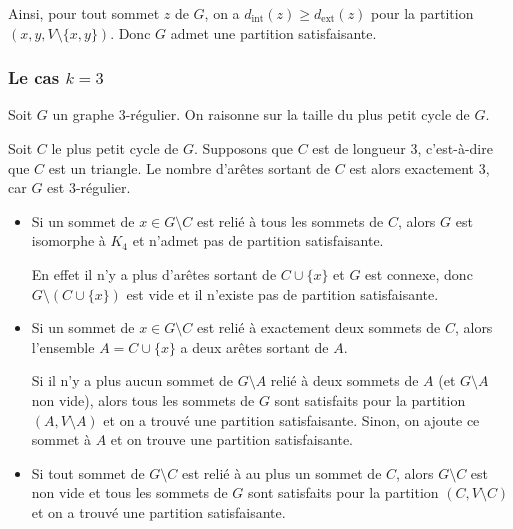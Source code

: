 Ainsi, pour tout sommet \(z\) de \(G\), on a \(d_{\mathrm{int}}(z) \geq d_{\mathrm{ext}}(z)\) pour la partition \(({x, y}, V \setminus \{x, y\})\).
Donc \(G\) admet une partition satisfaisante.

\subsubsection{Le cas \(k = 3\)}\label{subsubsec:ss4_2_3}

Soit \(G\) un graphe \(3\)-régulier.
On raisonne sur la taille du plus petit cycle de \(G\).

Soit \(C\) le plus petit cycle de \(G\).
Supposons que \(C\) est de longueur 3, c'est-à-dire que \(C\) est un triangle.
Le nombre d'arêtes sortant de \(C\) est alors exactement 3, car \(G\) est \(3\)-régulier.

\begin{itemize}
    \item Si un sommet de \(x \in G \setminus C\) est relié à tous les sommets de \(C\), alors \(G\) est isomorphe à \(K_4\) et n'admet pas de partition satisfaisante.

    \vspace{2mm}
    

    En effet il n'y a plus d'arêtes sortant de \(C \cup \{x\}\) et \(G\) est connexe, donc \(G \setminus (C \cup \{x\})\) est vide et il n'existe pas de partition satisfaisante.

    \item Si un sommet de \(x \in G \setminus C\) est relié à exactement deux sommets de \(C\), alors l'ensemble \(A = C \cup \{x\}\) a deux arêtes sortant de \(A\).

    \vspace{2mm}
    
    Si il n'y a plus aucun sommet de \(G \setminus A\) relié à deux sommets de \(A\) (et \(G \setminus A\) non vide), alors tous les sommets de \(G\) sont satisfaits pour la partition \((A, V \setminus A)\) et on a trouvé une partition satisfaisante.
    Sinon, on ajoute ce sommet à \(A\) et on trouve une partition satisfaisante.

    \vspace{2mm}
    \begin{figure}[H]
        \CenterFloatBoxes{}
        \begin{floatrow}
            

            
        \end{floatrow}
    \end{figure}

    \item Si tout sommet de \(G \setminus C\) est relié à au plus un sommet de \(C\), alors \(G \setminus C\) est non vide et tous les sommets de \(G\) sont satisfaits pour la partition \((C, V \setminus C)\) et on a trouvé une partition satisfaisante.

    \vspace{2mm}
    
\end{itemize}

